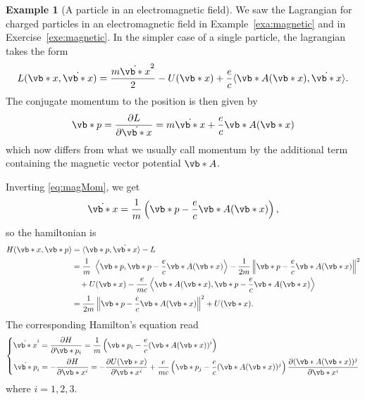 \documentclass[english,fontsize=11pt,paper=b5]{scrbook}
\theoremstyle{definition}
\newtheorem{example}{Example}[chapter]
\begin{document}
    \begin{example}[A particle in an electromagnetic field]\label{exe:magneticH}
      We saw the Lagrangian for charged particles in an electromagnetic field in Example~\ref{exa:magnetic} and in Exercise~\ref{exe:magnetic}.
      In the simpler case of a single particle, the lagrangian takes the form
      \begin{equation}
        L(\vb*{x},\dot{\vb*{x}}) = \frac{m \dot{\vb*{x}}^2}{2} - U(\vb*{x}) + \frac ec \langle\vb* A(\vb*{x}), \dot{\vb*{x}}\rangle.
      \end{equation}
      The conjugate momentum to the position is then given by
      \begin{equation}\label{eq:magMom}
        \vb*{p} = \frac{\partial L}{\partial \dot{\vb*{x}}} = m \dot{\vb*{x}} + \frac{e}{c}\vb* A(\vb*{x})
      \end{equation}
      which now differs from what we usually call momentum by the additional term containing the magnetic vector potential $\vb* A$.

      Inverting \eqref{eq:magMom}, we get
      \begin{equation}
        \dot{\vb*{x}} = \frac1m \left( \vb*{p} - \frac{e}{c}\vb* A(\vb*{x}) \right),
      \end{equation}
      so the hamiltonian is
      \begin{align}
        H(\vb*{x}, \vb*{p}) & = \langle\vb*{p}, \dot{\vb*{x}}\rangle - L                                        \\
                            & = \frac1m\ \left\langle \vb*{p}, \vb*{p} - \frac{e}{c}\vb* A(\vb*{x})\right\rangle -
                            \frac1{2m}\left\|\vb*{p} - \frac{e}{c}\vb* A(\vb*{x})\right\|^2                                \\
                            & \quad + U(\vb*{x})
                            - \frac e{mc} \left\langle\vb* A(\vb*{x}), \vb*{p} - \frac{e}{c}\vb* A(\vb*{x})\right\rangle
                            \\
                            & = \frac1{2m}\left\|\vb*{p} - \frac{e}{c}\vb* A(\vb*{x})\right\|^2 + U(\vb*{x}).
      \end{align}
      The corresponding Hamilton's equation read
      \begin{equation}
        \left\lbrace
          \begin{aligned}
            \dot{\vb*{x}}^i & = \frac{\partial H}{\partial \vb*{p}_i} = \frac1m \left(\vb*{p}_i - \frac{e}{c}(\vb* A(\vb*{x}))^i\right)                                                                                               \\
            \dot{\vb*{p}}_i & = -\frac{\partial H}{\partial \vb*{x}^i} = -\frac{\partial U(\vb*{x})}{\partial \vb*{x}^i} + \frac{e}{mc} \left(\vb*{p}_j - \frac{e}{c}(\vb* A(\vb*{x}))^j\right)\frac{\partial (\vb* A(\vb*{x}))^j}{\partial \vb*{x}^i}
          \end{aligned}
        \right.
      \end{equation}
      where $i=1,2,3$.


\end{example}
\end{document}
